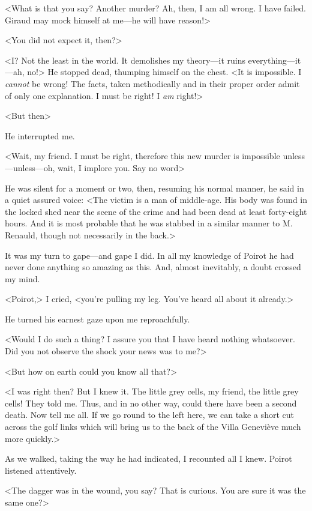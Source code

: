  <What is that you say? Another murder? Ah, then, I am all wrong. I have failed. Giraud may mock himself at me—he will have reason!> 

 <You did not expect it, then?> 

 <I? Not the least in the world. It demolishes my theory—it ruins everything—it—ah, no!> He stopped dead, thumping himself on the chest. <It is impossible. I \emph{cannot} be wrong! The facts, taken methodically and in their proper order admit of only one explanation. I must be right! I \emph{am} right!> 

 <But then\longdash> 

 He interrupted me. 

 <Wait, my friend. I must be right, therefore this new murder is impossible unless—unless—oh, wait, I implore you. Say no word\longdash> 

 He was silent for a moment or two, then, resuming his normal manner, he said in a quiet assured voice: <The victim is a man of middle-age. His body was found in the locked shed near the scene of the crime and had been dead at least forty-eight hours. And it is most probable that he was stabbed in a similar manner to M. Renauld, though not necessarily in the back.> 

 It was my turn to gape—and gape I did. In all my knowledge of Poirot he had never done anything so amazing as this. And, almost inevitably, a doubt crossed my mind. 

 <Poirot,> I cried, <you're pulling my leg. You've heard all about it already.> 

 He turned his earnest gaze upon me reproachfully. 

 <Would I do such a thing? I assure you that I have heard nothing whatsoever. Did you not observe the shock your news was to me?> 

 <But how on earth could you know all that?> 

 <I was right then? But I knew it. The little grey cells, my friend, the little grey cells! They told me. Thus, and in no other way, could there have been a second death. Now tell me all. If we go round to the left here, we can take a short cut across the golf links which will bring us to the back of the Villa Geneviève much more quickly.> 

 As we walked, taking the way he had indicated, I recounted all I knew. Poirot listened attentively. 

 <The dagger was in the wound, you say? That is curious. You are sure it was the same one?> 

